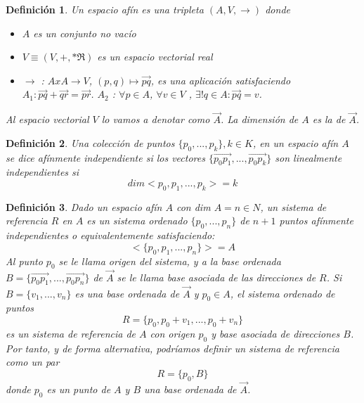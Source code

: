 \documentclass[a4paper,11pt, oneside]{book}
\newtheorem{defi}{Definición}
\begin{document}
\begin{defi}
	Un espacio afín es una tripleta $(A, V, \rightarrow)$ donde
	\begin{itemize}
		\item $A$ es un conjunto no vacío
		\item $V \equiv (V, +, *\Re)$ es un espacio vectorial real
		\item $\rightarrow$ : $A x A \rightarrow V$, $(p,q) \mapsto \overrightarrow{pq}$, es una aplicación satisfaciendo
		$A_1 : \overrightarrow{pq} + \overrightarrow{qr} = \overrightarrow{pr}$.
		$A_2$ : $\forall p \in A$, $\forall v \in V$ , $\exists! q \in A : \overrightarrow{pq} = v$.
	\end{itemize}
	Al espacio vectorial $V$ lo vamos a denotar como $\overrightarrow{A}$. La dimensión de $A$ es la de $\overrightarrow{A}$.
\end{defi}
\begin{defi}
	Una colección de puntos $\{p_0,...,p_k\}, k \in K$, en un espacio afín $A$ se dice afínmente independiente si los vectores $\{\overrightarrow{p_0p_1},...,\overrightarrow{p_0p_k}\}$ son linealmente independientes si
	\begin{equation}
	dim<{p_0,p_1,...,p_k}> = k
	\end{equation}
\end{defi}
\begin{defi}
	Dado un espacio afín $A$ con dim $A = n \in N$, un sistema de referencia $R$ en $A$ es un sistema ordenado $\{p_0, ..., p_n\}$ de $n+1$ puntos afínmente independientes o equivalentemente satisfaciendo:
	\begin{equation}
	<\{p_0,p_1,...,p_n\}> = A
	\end{equation}
	Al punto $p_0$ se le llama origen del sistema, y a la base ordenada $B = \{\overrightarrow{p_0p_1}, ..., \overrightarrow{p_0p_n}\}$ de $\overrightarrow{A}$ se le llama base asociada de las direcciones de $R$.
	Si $B = \{v_1,...,v_n\}$ es una base ordenada de $\overrightarrow{A}$ y $p_0 \in A$, el sistema ordenado de puntos
	\begin{equation}
	R = \{p_0, p_0+v_1, ..., p_0+v_n\}
	\end{equation}
	es un sistema de referencia de $A$ con origen $p_0$ y base asociada de direcciones $B$. Por tanto, y de forma alternativa, podríamos definir un sistema de referencia como un par
	\begin{equation}
	R = \{p_0, B\}
	\end{equation}
	donde $p_0$ es un punto de $A$ y $B$ una base ordenada de $\overrightarrow{A}$.
\end{defi}
\end{document}
